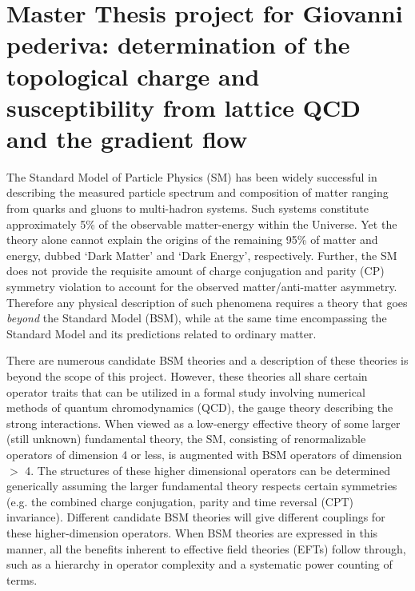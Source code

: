 \documentclass[aps,prc,twocolumn,showpacs,floatfix,nofootinbib,preprintnumbers,superscriptaddress,amsmath,amssymb]{revtex4-1}
\begin{document}
\pagestyle{plain}

\section*{Master Thesis project for Giovanni pederiva: determination of the topological charge and susceptibility 
from lattice QCD and the gradient flow}

The Standard Model of Particle Physics (SM) has been widely successful in describing 
the measured particle spectrum and composition of matter ranging from quarks and gluons 
to multi-hadron systems.  Such systems constitute approximately 5\% of the observable 
matter-energy within the Universe.  Yet the theory alone cannot explain the origins of 
the remaining 95\% of matter and energy, dubbed `Dark Matter' and `Dark Energy', respectively.  
Further, the SM does not provide the requisite amount of charge conjugation and parity (CP) 
symmetry violation to account for the observed matter/anti-matter asymmetry.  Therefore any physical description of such 
phenomena requires a theory that goes \emph{beyond} the Standard Model (BSM), while at the 
same time encompassing the Standard Model and its predictions related to ordinary matter.

There are numerous candidate BSM theories and a description of these theories is 
beyond the scope of this project.  However, these theories all share certain operator 
traits that can be utilized in a formal study involving numerical methods of 
quantum chromodynamics (QCD), the gauge theory describing the strong interactions.  
When viewed as a low-energy effective theory of some larger (still unknown) fundamental theory, 
the SM, consisting of renormalizable operators of dimension 4 or less, 
is augmented with BSM operators of dimension $>$ 4.  The structures of these higher 
dimensional operators can be determined generically assuming the larger fundamental theory 
respects certain symmetries (e.g. the combined charge conjugation, parity and time reversal (CPT) invariance). 
Different candidate BSM theories will give different couplings for these higher-dimension operators.  When BSM theories 
are expressed in this manner, all the benefits inherent to effective field theories (EFTs) follow through, 
such as a hierarchy in operator complexity and a systematic power counting of terms.
\end{document}
